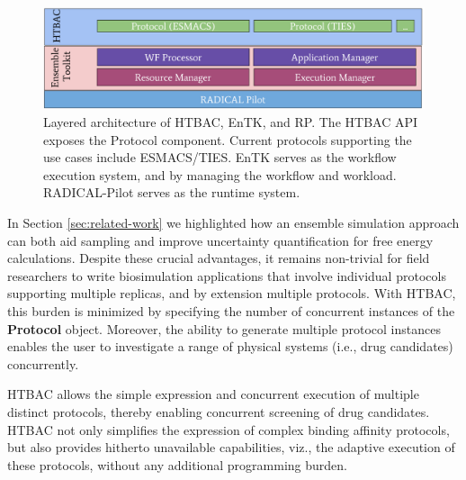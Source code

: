 \begin{figure}
  \centering
   \includegraphics[width=\columnwidth]{figures/isc_htbac_integration_with_entk_RP.pdf}
  \caption{Layered architecture of HTBAC, EnTK, and RP. The HTBAC API exposes the Protocol
  component. Current protocols supporting the use cases include ESMACS/TIES.  
  EnTK serves as the workflow execution system, and by managing the workflow and workload. 
  RADICAL-Pilot serves as the runtime system.}
\label{fig:integration}
\end{figure}



In Section \ref{sec:related-work} we highlighted how an ensemble
simulation approach can both aid sampling and improve uncertainty
quantification for free energy calculations. Despite these crucial advantages,
it remains non-trivial for field researchers to write biosimulation
applications that involve individual protocols supporting multiple replicas,
and by extension multiple protocols. With HTBAC, this burden is minimized by
specifying the number of concurrent instances of the \textbf{Protocol} object.
Moreover, the ability to generate multiple protocol instances enables the user
to investigate a range of physical systems (i.e., drug candidates)
concurrently.

HTBAC allows the simple expression and concurrent execution of multiple
distinct protocols, thereby enabling concurrent screening of drug candidates.
HTBAC not only simplifies the expression of complex binding affinity
protocols, but also provides hitherto unavailable capabilities, viz., the
adaptive execution of these protocols, without any additional programming
burden. 



